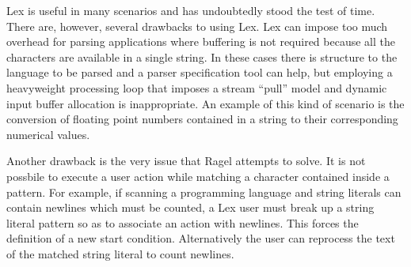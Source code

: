 \documentclass[letterpaper,11pt,oneside]{book}
\begin{document}
Lex is useful in many scenarios and has undoubtedly stood the test of time.
There are, however, several drawbacks to using Lex.  Lex can impose too much
overhead for parsing applications where buffering is not required because all
the characters are available in a single string.  In these cases there is
structure to the language to be parsed and a parser specification tool can
help, but employing a heavyweight processing loop that imposes a stream
``pull'' model and dynamic input buffer allocation is inappropriate.  An
example of this kind of scenario is the conversion of floating point numbers
contained in a string to their corresponding numerical values.

Another drawback is the very issue that Ragel attempts to solve.
It is not possbile to execute a user action while
matching a character contained inside a pattern. For example, if scanning a
programming language and string literals can contain newlines which must be
counted, a Lex user must break up a string literal pattern so as to associate
an action with newlines. This forces the definition of a new start condition.
Alternatively the user can reprocess the text of the matched string literal to
count newlines. 
\end{document}
